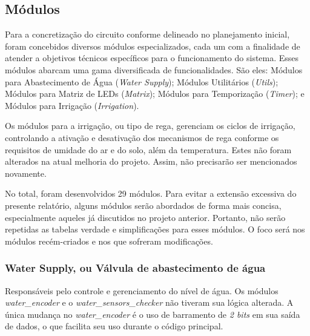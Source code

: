 \documentclass[
	article,			%
	11pt,				%
	oneside,			%
	a4paper,			%
	english,			%
	brazil,				%
	sumario=tradicional
	]{abntex2}
\begin{document}
\subsection{Módulos}
Para a concretização do circuito conforme delineado no planejamento inicial, foram concebidos diversos módulos especializados, cada um com a finalidade de atender a objetivos técnicos específicos para o funcionamento do sistema. Esses módulos abarcam uma gama diversificada de funcionalidades. São eles: Módulos para Abastecimento de Água (\textit{Water Supply}); Módulos Utilitários (\textit{Utils}); Módulos para Matriz de LEDs (\textit{Matrix}); Módulos para Temporização (\textit{Timer}); e Módulos para Irrigação (\textit{Irrigation}).

Os módulos para a irrigação, ou tipo de rega, gerenciam os ciclos de irrigação, controlando a ativação e desativação dos mecanismos de rega conforme os requisitos de umidade do ar e do solo, além da temperatura. Estes não foram alterados na atual melhoria do projeto. Assim, não precisarão ser mencionados novamente.

No total, foram desenvolvidos 29 módulos. Para evitar a extensão excessiva do presente relatório, alguns módulos serão abordados de forma mais concisa, especialmente aqueles já discutidos no projeto anterior. Portanto, não serão repetidas as tabelas verdade e simplificações para esses módulos. O foco será nos módulos recém-criados e nos que sofreram modificações.




\subsubsection{Water Supply, ou Válvula de abastecimento de água}

Responsáveis pelo controle e gerenciamento do nível de água. Os módulos \textit{water\_encoder} e o \textit{water\_sensors\_checker} não tiveram sua lógica alterada. A única mudança no \textit{water\_encoder} é o uso de barramento de \textit{2 bits} em sua saída de dados, o que facilita seu uso durante o código principal.
\end{document}
